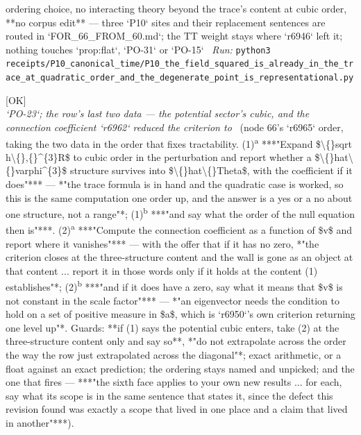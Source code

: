\begin{description}
ordering choice, no interacting theory beyond the trace's content at cubic order, **no corpus edit** --- three `P10` sites and their replacement sentences are routed in `FOR\_66\_FROM\_60.md`; the TT weight stays where `r6946` left it; nothing touches `prop:flat`, `PO-31` or `PO-15`
\ \emph{Run:} \texttt{python3 receipts/P10\_canonical\_time/P10\_the\_field\_squared\_is\_already\_in\_the\_trace\_at\_quadratic\_order\_and\_the\_degenerate\_point\_is\_representational.py}
\item[\rcptlabel{P10_the_operator_is_an_inverted_quartic_so_the_deficiency_is_two_two_and_the_measure_closes_it_anyway}{P10R33}\textbf{P10R33}\quad\texttt{P10\_the\_operator\_is\_an\_inverted\_quartic\_so\_the\_deficiency\_is\_two\_two\_and\_the\_measure\_closes\_it\_anyway}]\hfill\textsf{[OK]}\\
\textit{`PO-23`; the row's last two data --- the potential sector's cubic, and the connection coefficient `r6962` reduced the criterion to} \ (node 66's `r6965` order, taking the two data in the order that fixes tractability. (1)\textsuperscript{a} ***"Expand \$\textbackslash\{\}sqrt h\textbackslash\{\},\{\}\textasciicircum{}\{3\}R\$ to cubic order in the perturbation and report whether a \$\textbackslash\{\}hat\textbackslash\{\}varphi\textasciicircum{}\{3\}\$ structure survives into \$\textbackslash\{\}hat\textbackslash\{\}Theta\$, with the coefficient if it does"*** --- *"the trace formula is in hand and the quadratic case is worked, so this is the same computation one order up, and the answer is a yes or a no about one structure, not a range"*; (1)\textsuperscript{b} ***"and say what the order of the null equation then is"***. (2)\textsuperscript{a} ***"Compute the connection coefficient as a function of \$v\$ and report where it vanishes"*** --- with the offer that if it has no zero, *"the criterion closes at the three-structure content and the wall is gone as an object at that content ... report it in those words only if it holds at the content (1) establishes"*; (2)\textsuperscript{b} ***"and if it does have a zero, say what it means that \$v\$ is not constant in the scale factor"*** --- *"an eigenvector needs the condition to hold on a set of positive measure in \$a\$, which is `r6950`'s own criterion returning one level up"*.  Guards: **if (1) says the potential cubic enters, take (2) at the three-structure content only and say so**, *"do not extrapolate across the order the way the row just extrapolated across the diagonal"*; exact arithmetic, or a float against an exact prediction; the ordering stays named and unpicked; and the one that fires --- ***"the sixth face applies to your own new results ... for each, say what its scope is in the same sentence that states it, since the defect this revision found was exactly a scope that lived in one place and a claim that lived in another"***). 

\end{description}
